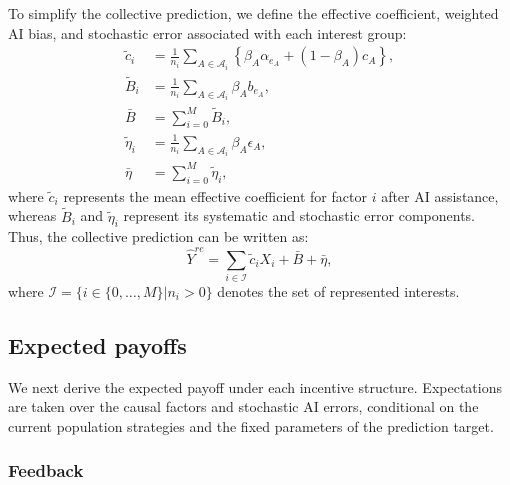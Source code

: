 \documentclass[12pt]{article}
\begin{document}
To simplify the collective prediction, we define the effective coefficient, weighted AI bias, and stochastic error associated with each interest group:
\begin{align}
\tilde{c}_i &= \frac{1}{n_i}\sum_{A \in \mathcal{A}_i}\left\{\beta_A\alpha_{e_A} + (1-\beta_A)c_A\right\},\\
\tilde{B}_i &= \frac{1}{n_i}\sum_{A \in \mathcal{A}_i}\beta_Ab_{e_A},\\
\bar{B} &= \sum_{i = 0}^{M}\tilde{B}_i,\\
\tilde{\eta}_i &= \frac{1}{n_i}\sum_{A \in \mathcal{A}_i}\beta_A\epsilon_A,\\
\bar{\eta} &= \sum_{i = 0}^{M}\tilde{\eta}_i,
\end{align}
where $\tilde{c}_i$ represents the mean effective coefficient for factor $i$ after AI assistance, whereas $\tilde{B}_i$ and $\tilde{\eta}_i$ represent its systematic and stochastic error components.
Thus, the collective prediction can be written as:
\begin{equation}
\hat{Y}^{re} = \sum_{i\in\mathcal I}\tilde{c}_iX_i+\bar{B}+\bar{\eta},
\end{equation}
where $\mathcal I=\{i\in\{0,\ldots,M\}|n_i>0\}$ denotes the set of represented interests.

\subsection*{Expected payoffs}

We next derive the expected payoff under each incentive structure. 
Expectations are taken over the causal factors and stochastic AI errors, conditional on the current population strategies and the fixed parameters of the prediction target.

\subsubsection*{Feedback}
\end{document}
